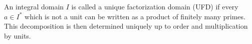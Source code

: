 An integral domain $I$ is called a unique factorization domain (UFD) if every $a \in I^*$ which is not a unit can be written as a product of finitely many primes. This decomposition is then determined uniquely up to order and multiplication by units.
